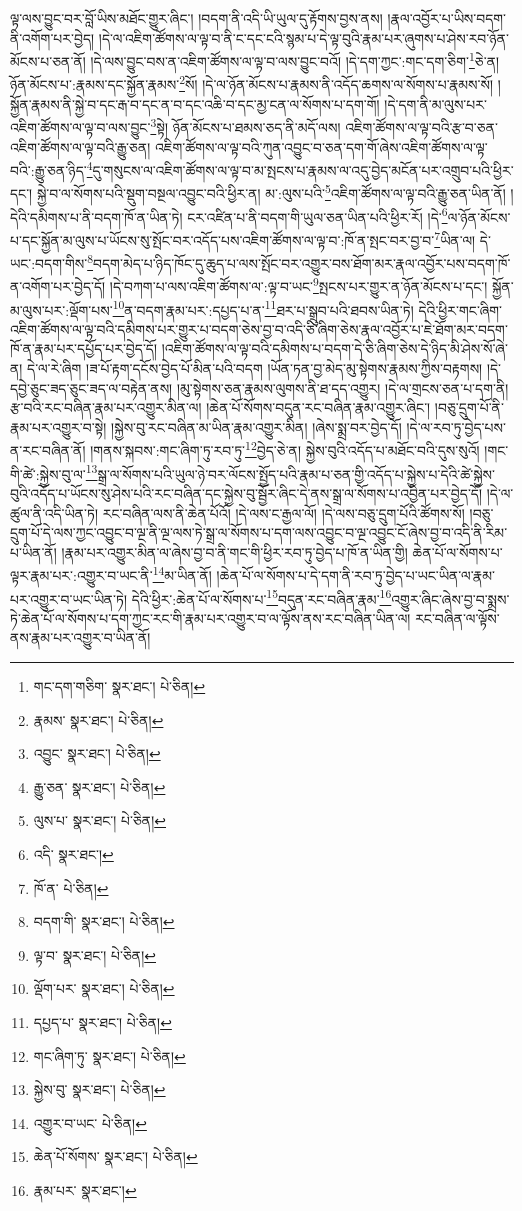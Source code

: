 ལྟ་ལས་བྱུང་བར་བློ་ཡིས་མཐོང་གྱུར་ཞིང་། །བདག་ནི་འདི་ཡི་ཡུལ་དུ་རྟོགས་བྱས་ནས། །རྣལ་འབྱོར་པ་ཡིས་བདག་ནི་འགོག་པར་བྱེད། །དེ་ལ་འཇིག་ཚོགས་ལ་ལྟ་བ་ནི་ང་དང་ངའི་སྙམ་པ་དེ་ལྟ་བུའི་རྣམ་པར་ཞུགས་པ་ཤེས་རབ་ཉོན་མོངས་པ་ཅན་ནོ། །དེ་ལས་བྱུང་བས་ན་འཇིག་ཚོགས་ལ་ལྟ་བ་ལས་བྱུང་བའོ། །དེ་དག་ཀྱང་:གང་དག་ཅིག་\footnote{གང་དག་གཅིག་  སྣར་ཐང་།  པེ་ཅིན། }ཅེ་ན། ཉོན་མོངས་པ་:རྣམས་དང་སྐྱོན་རྣམས་\footnote{རྣམས་  སྣར་ཐང་།  པེ་ཅིན། }སོ། །དེ་ལ་ཉོན་མོངས་པ་རྣམས་ནི་འདོད་ཆགས་ལ་སོགས་པ་རྣམས་སོ། །སྐྱོན་རྣམས་ནི་སྐྱེ་བ་དང་རྒ་བ་དང་ན་བ་དང་འཆི་བ་དང་མྱ་ངན་ལ་སོགས་པ་དག་གོ། །དེ་དག་ནི་མ་ལུས་པར་འཇིག་ཚོགས་ལ་ལྟ་བ་ལས་བྱུང་\footnote{འབྱུང་  སྣར་ཐང་།  པེ་ཅིན། }སྟེ། ཉོན་མོངས་པ་ཐམས་ཅད་ནི་མདོ་ལས། འཇིག་ཚོགས་ལ་ལྟ་བའི་རྩ་བ་ཅན་འཇིག་ཚོགས་ལ་ལྟ་བའི་རྒྱུ་ཅན། འཇིག་ཚོགས་ལ་ལྟ་བའི་ཀུན་འབྱུང་བ་ཅན་དག་གོ་ཞེས་འཇིག་ཚོགས་ལ་ལྟ་བའི་:རྒྱུ་ཅན་ཉིད་\footnote{རྒྱུ་ཅན་  སྣར་ཐང་།  པེ་ཅིན། }དུ་གསུངས་ལ་འཇིག་ཚོགས་ལ་ལྟ་བ་མ་སྤངས་པ་རྣམས་ལ་འདུ་བྱེད་མངོན་པར་འགྲུབ་པའི་ཕྱིར་དང་། སྐྱེ་བ་ལ་སོགས་པའི་སྡུག་བསྔལ་འབྱུང་བའི་ཕྱིར་ན། མ་:ལུས་པའི་\footnote{ལུས་པ་  སྣར་ཐང་།  པེ་ཅིན། }འཇིག་ཚོགས་ལ་ལྟ་བའི་རྒྱུ་ཅན་ཡིན་ནོ། །དེའི་དམིགས་པ་ནི་བདག་ཁོ་ན་ཡིན་ཏེ། ངར་འཛིན་པ་ནི་བདག་གི་ཡུལ་ཅན་ཡིན་པའི་ཕྱིར་རོ། །དེ་\footnote{འདི་  སྣར་ཐང་། }ལ་ཉོན་མོངས་པ་དང་སྐྱོན་མ་ལུས་པ་ཡོངས་སུ་སྤོང་བར་འདོད་པས་འཇིག་ཚོགས་ལ་ལྟ་བ་:ཁོ་ན་སྤང་བར་བྱ་བ་\footnote{ཁོ་ན་  པེ་ཅིན། }ཡིན་ལ། དེ་ཡང་:བདག་གིས་\footnote{བདག་གི་  སྣར་ཐང་།  པེ་ཅིན། }བདག་མེད་པ་ཉིད་ཁོང་དུ་ཆུད་པ་ལས་སྤོང་བར་འགྱུར་བས་ཐོག་མར་རྣལ་འབྱོར་པས་བདག་ཁོ་ན་འགོག་པར་བྱེད་དོ། །དེ་བཀག་པ་ལས་འཇིག་ཚོགས་ལ་:ལྟ་བ་ཡང་\footnote{ལྟ་བ་  སྣར་ཐང་།  པེ་ཅིན། }སྤངས་པར་གྱུར་ན་ཉོན་མོངས་པ་དང་། སྐྱོན་མ་ལུས་པར་:ལྡོག་པས་\footnote{ལྡོག་པར་  སྣར་ཐང་།  པེ་ཅིན། }ན་བདག་རྣམ་པར་:དཔྱད་པ་ན་\footnote{དཔྱད་པ་  སྣར་ཐང་།  པེ་ཅིན། }ཐར་པ་སྒྲུབ་པའི་ཐབས་ཡིན་ཏེ། དེའི་ཕྱིར་གང་ཞིག་འཇིག་ཚོགས་ལ་ལྟ་བའི་དམིགས་པར་གྱུར་པ་བདག་ཅེས་བྱ་བ་འདི་ཅི་ཞིག་ཅེས་རྣལ་འབྱོར་པ་ཇེ་ཐོག་མར་བདག་ཁོ་ན་རྣམ་པར་དཔྱོད་པར་བྱེད་དོ། །འཇིག་ཚོགས་ལ་ལྟ་བའི་དམིགས་པ་བདག་དེ་ཅི་ཞིག་ཅེས་དེ་ཉིད་མི་ཤེས་སོ་ཞེ་ན། དེ་ལ་རེ་ཞིག །ཟ་པོ་རྟག་དངོས་བྱེད་པོ་མིན་པའི་བདག །ཡོན་ཏན་བྱ་མེད་མུ་སྟེགས་རྣམས་ཀྱིས་བརྟགས། །དེ་དབྱེ་ཅུང་ཟད་ཅུང་ཟད་ལ་བརྟེན་ནས། །མུ་སྟེགས་ཅན་རྣམས་ལུགས་ནི་ཐ་དད་འགྱུར། །དེ་ལ་གྲངས་ཅན་པ་དག་ནི། རྩ་བའི་རང་བཞིན་རྣམ་པར་འགྱུར་མིན་ལ། །ཆེན་པོ་སོགས་བདུན་རང་བཞིན་རྣམ་འགྱུར་ཞིང་། །བཅུ་དྲུག་པོ་ནི་རྣམ་པར་འགྱུར་བ་སྟེ། །སྐྱེས་བུ་རང་བཞིན་མ་ཡིན་རྣམ་འགྱུར་མིན། །ཞེས་སྨྲ་བར་བྱེད་དོ། །དེ་ལ་རབ་ཏུ་བྱེད་པས་ན་རང་བཞིན་ནོ། །གནས་སྐབས་:གང་ཞིག་ཏུ་རབ་ཏུ་\footnote{གང་ཞིག་ཏུ་  སྣར་ཐང་།  པེ་ཅིན། }བྱེད་ཅེ་ན། སྐྱེས་བུའི་འདོད་པ་མཐོང་བའི་དུས་སུའོ། །གང་གི་ཚེ་:སྐྱེས་བུ་ལ་\footnote{སྐྱེས་བུ་  སྣར་ཐང་།  པེ་ཅིན། }སྒྲ་ལ་སོགས་པའི་ཡུལ་ཉེ་བར་ལོངས་སྤྱོད་པའི་རྣམ་པ་ཅན་གྱི་འདོད་པ་སྐྱེས་པ་དེའི་ཚེ་སྐྱེས་བུའི་འདོད་པ་ཡོངས་སུ་ཤེས་པའི་རང་བཞིན་དང་སྐྱེས་བུ་སྦྱོར་ཞིང་དེ་ནས་སྒྲ་ལ་སོགས་པ་འབྱིན་པར་བྱེད་དོ། །དེ་ལ་ཚུལ་ནི་འདི་ཡིན་ཏེ། རང་བཞིན་ལས་ནི་ཆེན་པོའོ། །དེ་ལས་ང་རྒྱལ་ལོ། །དེ་ལས་བཅུ་དྲུག་པོའི་ཚོགས་སོ། །བཅུ་དྲུག་པོ་དེ་ལས་ཀྱང་འབྱུང་བ་ལྔ་ནི་ལྔ་ལས་ཏེ་སྒྲ་ལ་སོགས་པ་དག་ལས་འབྱུང་བ་ལྔ་འབྱུང་ངོ་ཞེས་བྱ་བ་འདི་ནི་རིམ་པ་ཡིན་ནོ། །རྣམ་པར་འགྱུར་མིན་ལ་ཞེས་བྱ་བ་ནི་གང་གི་ཕྱིར་རབ་ཏུ་བྱེད་པ་ཁོ་ན་ཡིན་གྱི། ཆེན་པོ་ལ་སོགས་པ་ལྟར་རྣམ་པར་:འགྱུར་བ་ཡང་ནི་\footnote{འགྱུར་བ་ཡང་  པེ་ཅིན། }མ་ཡིན་ནོ། །ཆེན་པོ་ལ་སོགས་པ་དེ་དག་ནི་རབ་ཏུ་བྱེད་པ་ཡང་ཡིན་ལ་རྣམ་པར་འགྱུར་བ་ཡང་ཡིན་ཏེ། དེའི་ཕྱིར་:ཆེན་པོ་ལ་སོགས་པ་\footnote{ཆེན་པོ་སོགས་  སྣར་ཐང་།  པེ་ཅིན། }བདུན་རང་བཞིན་རྣམ་\footnote{རྣམ་པར་  སྣར་ཐང་། }འགྱུར་ཞིང་ཞེས་བྱ་བ་སྨྲས་ཏེ་ཆེན་པོ་ལ་སོགས་པ་དག་ཀྱང་རང་གི་རྣམ་པར་འགྱུར་བ་ལ་ལྟོས་ནས་རང་བཞིན་ཡིན་ལ། རང་བཞིན་ལ་ལྟོས་ནས་རྣམ་པར་འགྱུར་བ་ཡིན་ནོ། 